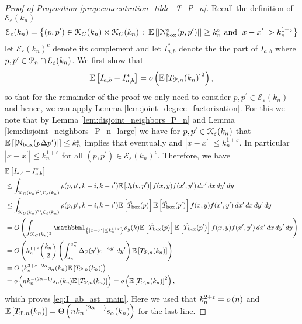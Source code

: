\begin{proof}[Proof of Proposition \ref{prop:concentration_tilde_T_P_n}]
Recall the definition of $\mathcal{E}_\varepsilon(k_n)$
\[
	\mathcal{E}_{\varepsilon}(k_n) = \left\{(p,p^\prime) \in {\mathcal K}_C(k_n) \times {\mathcal K}_C(k_n) 
	\, : \, \mathbb{E}\left[\left|{\mathcal N}_{\text{box}}^c(p,p^\prime)\right|\right] \ge k_n^{\varepsilon} \text{ and } |x - x^\prime| > k_n^{1 + \varepsilon} \right\}
\]
let $\mathcal{E}_\varepsilon(k_n)^c$ denote its complement and let $I_{a,b}^\ast$ denote the the part of $I_{a,b}$ where $p,p^\prime \in {\mathcal P}_n \cap \mathcal{E}_\varepsilon(k_n)$. We first show that
\begin{equation}\label{eq:I_ab_ast_main}
	\mathbb{E}\left[I_{a,b} - I_{a,b}^\ast\right] = o\left(\mathbb{E}\left[T_{{\mathcal P},n}(k_n)\right]^2\right),
\end{equation}
so that for the remainder of the proof we only need to consider $p, p^\prime \in \mathcal{E}_\varepsilon(k_n)$ and hence, we can apply Lemma \ref{lem:joint_degree_factorization}. For this we note that by Lemma \ref{lem:disjoint_neighbors_P_n} and Lemma \ref{lem:disjoint_neighbors_P_n_large} we have for $p,p^\prime \in {\mathcal K}_{\varepsilon}(k_n)$ that $\mathbb{E}\left[\left|{\mathcal N}_{\text{box}}(p\Delta p^\prime)\right|\right] \le k_n^{\varepsilon}$ implies that eventually and $|x-x^\prime| \le k_n^{1+\varepsilon}$. In particular $|x - x^\prime| \le k_n^{1+\varepsilon}$ for all $(p, p^\prime) \in \mathcal{E}_{\varepsilon}(k_n)^c$. Therefore, we have
\begin{align*}
	&\Exp{I_{a,b} - I_{a,b}^\ast}\\
	&\le \int_{\Kcal_C(k_n)^2 \setminus \mathcal{E}_\varepsilon(k_n)} \rho(p, p^\prime, k - i, k - i^\prime) 
		\Exp{J_b(p,p^\prime)} f(x,y) f(x^\prime,y^\prime) \, dx^\prime \, dx \, dy^\prime \, dy\\
	&\le \int_{\Kcal_C(k_n)^2 \setminus \mathcal{E}_\varepsilon(k_n)} \rho(p, p^\prime, k - i, k - i^\prime) 
		\Exp{\widetilde{T}_{\text{box}}(p)}\Exp{\widetilde{T}_{\text{box}}(p^\prime)} f(x,y) f(x^\prime,y^\prime) \, dx^\prime \, dx \, dy^\prime \, dy\\
	&= \bigO{\int_{\Kcal_C(k_n)^2} \ind{|x-x^\prime| \le k_n^{1 + \varepsilon}} \rho_{y}(k) 
		\Exp{\widetilde{T}_{\text{box}}(p)}\Exp{\widetilde{T}_{\text{box}}(p^\prime)} f(x,y) f(x^\prime,y^\prime) \, dx^\prime \, dx \, dy^\prime \, dy}\\
	&= \bigO{k_n^{1+\varepsilon} \binom{k_n}{2} \left(\int_{a_n^-}^{a_n^+} \Delta_{\Pcal}(y^\prime) 
			e^{-\alpha y^\prime} \, dy^\prime\right) \Exp{T_{\Pcal,n}(k_n)}}\\
	&= \bigO{k_n^{3 + \varepsilon -2\alpha} s_\alpha(k_n) \Exp{T_{\Pcal,n}(k_n)}}\\
	&= \smallO{n k_n^{-(2\alpha - 1)}s_\alpha(k_n) \Exp{T_{\Pcal,n}(k_n)}} = \smallO{\Exp{T_{\Pcal,n}(k_n)}^2},
\end{align*}
which proves \eqref{eq:I_ab_ast_main}. Here we used that $k_n^{2 + \varepsilon} = o\left(n\right)$ and $\mathbb{E}\left[T_{{\mathcal P},n}(k_n)\right] = \Theta\left(n k_n^{-(2\alpha + 1)}s_\alpha(k_n)\right)$ for the last line.



\end{proof}
